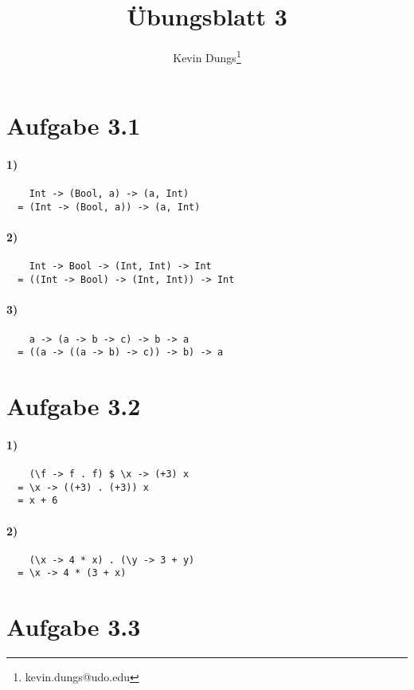 \documentclass[a4paper]{scrartcl}
\title{Übungsblatt 3}
\author{Kevin Dungs\thanks{kevin.dungs@udo.edu}}
\begin{document}
\maketitle

\section*{Aufgabe 3.1}
\paragraph{1)}
\begin{verbatim}
    Int -> (Bool, a) -> (a, Int)
  = (Int -> (Bool, a)) -> (a, Int)
\end{verbatim}

\paragraph{2)}
\begin{verbatim}
    Int -> Bool -> (Int, Int) -> Int
  = ((Int -> Bool) -> (Int, Int)) -> Int
\end{verbatim}

\paragraph{3)}
\begin{verbatim}
    a -> (a -> b -> c) -> b -> a
  = ((a -> ((a -> b) -> c)) -> b) -> a
\end{verbatim}


\section*{Aufgabe 3.2}
\paragraph{1)}
\begin{verbatim}
    (\f -> f . f) $ \x -> (+3) x
  = \x -> ((+3) . (+3)) x
  = x + 6
\end{verbatim}

\paragraph{2)}
\begin{verbatim}
    (\x -> 4 * x) . (\y -> 3 + y)
  = \x -> 4 * (3 + x)
\end{verbatim}


\section*{Aufgabe 3.3}
\end{document}
